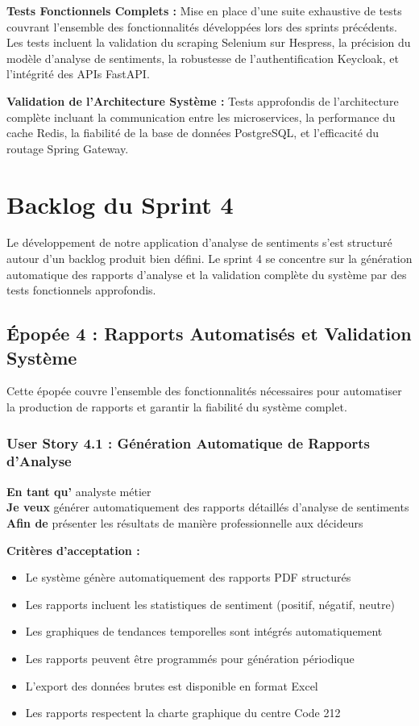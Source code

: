\textbf{Tests Fonctionnels Complets :} Mise en place d'une suite exhaustive de tests couvrant l'ensemble des fonctionnalités développées lors des sprints précédents. Les tests incluent la validation du scraping Selenium sur Hespress, la précision du modèle d'analyse de sentiments, la robustesse de l'authentification Keycloak, et l'intégrité des APIs FastAPI.

\textbf{Validation de l'Architecture Système :} Tests approfondis de l'architecture complète incluant la communication entre les microservices, la performance du cache Redis, la fiabilité de la base de données PostgreSQL, et l'efficacité du routage Spring Gateway.

\section{Backlog du Sprint 4}

Le développement de notre application d'analyse de sentiments s'est structuré autour d'un backlog produit bien défini. Le sprint 4 se concentre sur la génération automatique des rapports d'analyse et la validation complète du système par des tests fonctionnels approfondis.

\subsection{Épopée 4 : Rapports Automatisés et Validation Système}

Cette épopée couvre l'ensemble des fonctionnalités nécessaires pour automatiser la production de rapports et garantir la fiabilité du système complet.

\subsubsection{User Story 4.1 : Génération Automatique de Rapports d'Analyse}

\textbf{En tant qu'} analyste métier \\
\textbf{Je veux} générer automatiquement des rapports détaillés d'analyse de sentiments \\
\textbf{Afin de} présenter les résultats de manière professionnelle aux décideurs

\textbf{Critères d'acceptation :}
\begin{itemize}
    \item Le système génère automatiquement des rapports PDF structurés
    \item Les rapports incluent les statistiques de sentiment (positif, négatif, neutre)
    \item Les graphiques de tendances temporelles sont intégrés automatiquement
    \item Les rapports peuvent être programmés pour génération périodique
    \item L'export des données brutes est disponible en format Excel
    \item Les rapports respectent la charte graphique du centre Code 212
\end{itemize}

